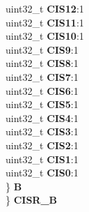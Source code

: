 \begin{DoxyCompactItemize}
\begin{tabbing}
\>\>uint32\_t {\bfseries CIS12}:1\\
\>\>uint32\_t {\bfseries CIS11}:1\\
\>\>uint32\_t {\bfseries CIS10}:1\\
\>\>uint32\_t {\bfseries CIS9}:1\\
\>\>uint32\_t {\bfseries CIS8}:1\\
\>\>uint32\_t {\bfseries CIS7}:1\\
\>\>uint32\_t {\bfseries CIS6}:1\\
\>\>uint32\_t {\bfseries CIS5}:1\\
\>\>uint32\_t {\bfseries CIS4}:1\\
\>\>uint32\_t {\bfseries CIS3}:1\\
\>\>uint32\_t {\bfseries CIS2}:1\\
\>\>uint32\_t {\bfseries CIS1}:1\\
\>\>uint32\_t {\bfseries CIS0}:1\\
\>\} {\bfseries B}\\
\} {\bfseries CISR\_B}\\


\end{tabbing}
\end{DoxyCompactItemize}
